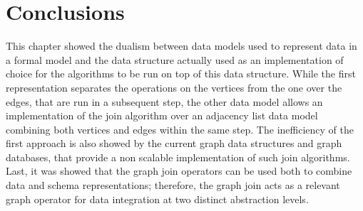 
\section{Conclusions}
This chapter showed the dualism between data models used to represent data in a formal model and the data structure actually used as an implementation of choice for the algorithms to be run on top of this data structure. While the first representation separates the operations on the vertices from the one over the edges, that are run in a subsequent step, the other data model allows an implementation of the join algorithm over an adjacency list data model combining both vertices and edges within the same step. The inefficiency of the first approach is also showed by the current graph data structures and graph databases, that provide a non scalable implementation of such join algorithms. Last, it was showed that the graph join operators can be used both to combine data and schema representations; therefore, the graph join acts as a relevant graph operator for data integration at two distinct abstraction levels.